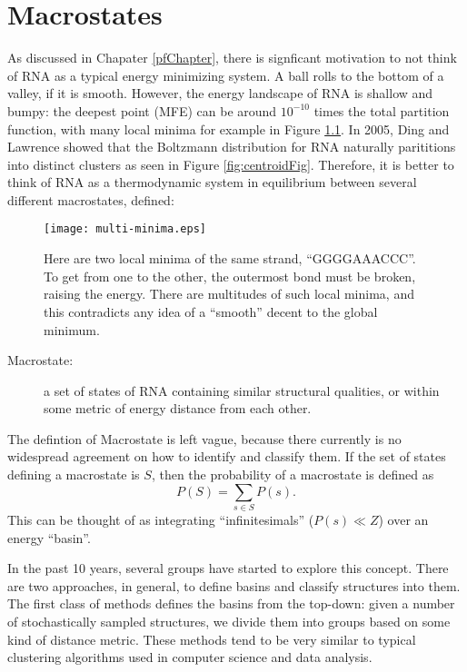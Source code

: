 \chapter{Macrostates}

As discussed in Chapater \ref{pfChapter}, there is signficant
motivation to not think of RNA as a typical energy minimizing
system. A ball rolls to the bottom of a valley, if it is
smooth. However, the energy landscape of RNA is shallow and bumpy: the
deepest point (MFE) can be around $10^{-10}$ times the total partition
function, with many local minima for example in Figure
\ref{fig:localMinima}. In 2005, Ding and Lawrence showed that the
Boltzmann distribution for RNA naturally parititions into distinct
clusters \cite{ding2005rna} as seen in Figure
\ref{fig:centroidFig}. Therefore, it is better to think of RNA as a
thermodynamic system in equilibrium between several different
macrostates, defined:
\begin{figure}[t]
\texttt{[image: multi-minima.eps]}
\caption{Here are two local minima of the same strand,
  ``GGGGAAACCC''. To get from one to the other, the outermost bond
  must be broken, raising the energy. There are multitudes of such
  local minima, and this contradicts any idea of a ``smooth'' decent
  to the global minimum.}
\label{fig:localMinima}
\end{figure}
\begin{description}
\item[Macrostate:] a set of states of RNA containing similar
  structural qualities, or within some metric of energy distance from
  each other.
\end{description}
The defintion of Macrostate is left vague, because there currently is
no widespread agreement on how to identify and classify them. If the
set of states defining a macrostate is $S$, then the probability of a
macrostate is defined as
\begin{equation} 
P(S) = \sum_{s \in S} P(s).
\end{equation}
This can be thought of as integrating ``infinitesimals'' ($P(s)\ll Z$)
over an energy ``basin''.

In the past 10 years, several groups have started to explore this
concept. There are two approaches, in general, to define basins and
classify structures into them. The first class of methods defines the
basins from the top-down: given a number of stochastically sampled
structures, we divide them into groups based on some kind of distance
metric. These methods tend to be very similar to typical clustering
algorithms used in computer science and data analysis.

